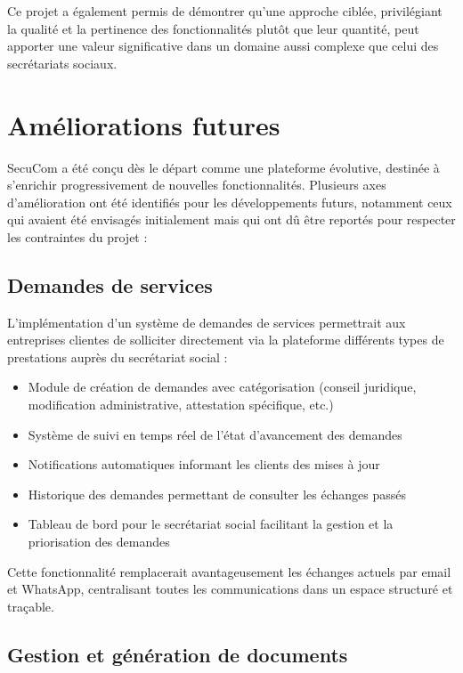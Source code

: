 \documentclass[12pt,a4paper]{report}
\begin{document}
Ce projet a également permis de démontrer qu'une approche ciblée, privilégiant la qualité et la pertinence des fonctionnalités plutôt que leur quantité, peut apporter une valeur significative dans un domaine aussi complexe que celui des secrétariats sociaux.

\section{Améliorations futures}

SecuCom a été conçu dès le départ comme une plateforme évolutive, destinée à s'enrichir progressivement de nouvelles fonctionnalités. Plusieurs axes d'amélioration ont été identifiés pour les développements futurs, notamment ceux qui avaient été envisagés initialement mais qui ont dû être reportés pour respecter les contraintes du projet :

\subsection{Demandes de services}

L'implémentation d'un système de demandes de services permettrait aux entreprises clientes de solliciter directement via la plateforme différents types de prestations auprès du secrétariat social :

\begin{itemize}
  \item Module de création de demandes avec catégorisation (conseil juridique, modification administrative, attestation spécifique, etc.)
  \item Système de suivi en temps réel de l'état d'avancement des demandes
  \item Notifications automatiques informant les clients des mises à jour
  \item Historique des demandes permettant de consulter les échanges passés
  \item Tableau de bord pour le secrétariat social facilitant la gestion et la priorisation des demandes
\end{itemize}

Cette fonctionnalité remplacerait avantageusement les échanges actuels par email et WhatsApp, centralisant toutes les communications dans un espace structuré et traçable.

\subsection{Gestion et génération de documents}
\end{document}
